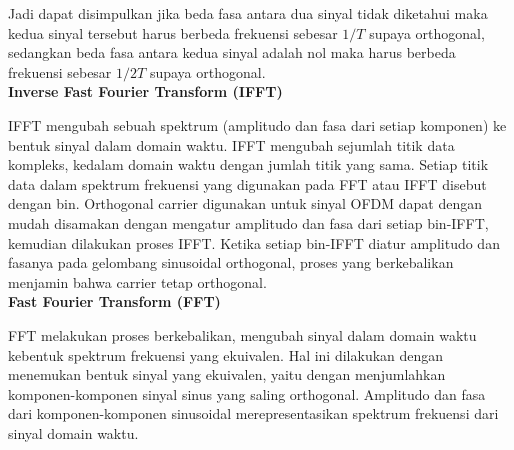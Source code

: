 \documentclass{article}
\begin{document}
Jadi dapat disimpulkan jika beda fasa antara dua sinyal tidak diketahui maka kedua sinyal tersebut harus berbeda frekuensi sebesar $1/T$ supaya orthogonal, sedangkan beda fasa antara kedua sinyal adalah nol maka harus berbeda frekuensi sebesar $1/2T$ supaya orthogonal.\\

\textbf{Inverse Fast Fourier Transform (IFFT)}

IFFT mengubah sebuah spektrum (amplitudo dan fasa dari setiap komponen) ke bentuk sinyal dalam domain waktu. IFFT mengubah sejumlah titik data kompleks, kedalam domain waktu dengan jumlah titik yang sama. Setiap titik data dalam spektrum frekuensi yang digunakan pada FFT atau IFFT disebut dengan bin. Orthogonal carrier digunakan untuk sinyal OFDM dapat dengan mudah disamakan dengan mengatur amplitudo dan fasa dari setiap bin-IFFT, kemudian dilakukan proses IFFT. Ketika setiap bin-IFFT diatur amplitudo dan fasanya pada gelombang sinusoidal orthogonal, proses yang berkebalikan menjamin bahwa carrier tetap orthogonal.\\

\textbf{Fast Fourier Transform (FFT)}

FFT melakukan proses berkebalikan, mengubah sinyal dalam domain waktu kebentuk spektrum frekuensi yang ekuivalen. Hal ini dilakukan dengan menemukan bentuk sinyal yang ekuivalen, yaitu dengan menjumlahkan komponen-komponen sinyal sinus yang saling orthogonal. Amplitudo dan fasa dari komponen-komponen sinusoidal merepresentasikan spektrum frekuensi dari sinyal domain waktu.
\end{document}

